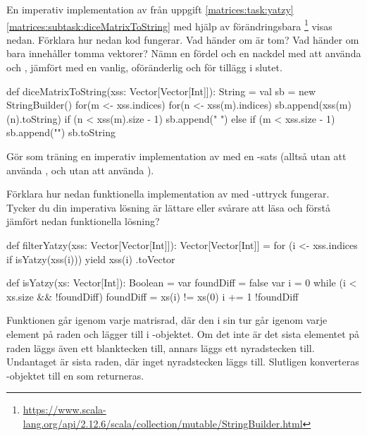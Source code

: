 \Subtask En imperativ implementation av  från uppgift \ref{matrices:task:yatzy}\ref{matrices:subtask:diceMatrixToString} med hjälp av förändringsbara  \footnote{\url{https://www.scala-lang.org/api/2.12.6/scala/collection/mutable/StringBuilder.html}} visas nedan. Förklara hur nedan kod fungerar. Vad händer om  är tom? Vad händer om  bara innehåller tomma vektorer? Nämn en fördel och en nackdel med att använda  och , jämfört med en vanlig, oföränderlig  och \code{+} för tillägg i slutet.
\begin{Code}
def diceMatrixToString(xss: Vector[Vector[Int]]): String = {
  val sb = new StringBuilder()
  for(m <- xss.indices) {
    for(n <- xss(m).indices) {
      sb.append(xss(m)(n).toString)
      if (n < xss(m).size - 1) sb.append(" ")
      else if (m < xss.size - 1) sb.append("\n")
    }
  }
  sb.toString
}
\end{Code}

\Subtask Gör som träning en imperativ implementation av  med en -sats (alltså utan att använda , och utan att använda ).


\Subtask Förklara hur nedan funktionella implementation av  med -uttryck fungerar. Tycker du din imperativa lösning är lättare eller svårare att läsa och förstå jämfört nedan funktionella lösning?
\begin{CodeSmall}
def filterYatzy(xss: Vector[Vector[Int]]): Vector[Vector[Int]] = {
  for (i <- xss.indices if isYatzy(xss(i))) yield xss(i)
}.toVector
\end{CodeSmall}


\SOLUTION

\TaskSolved \what

\SubtaskSolved  \begin{Code}
def isYatzy(xs: Vector[Int]): Boolean = {
	var foundDiff = false
	var i = 0
	while (i < xs.size && !foundDiff) {
		foundDiff = xs(i) != xs(0)
		i += 1
	}
	!foundDiff
}
\end{Code}


\SubtaskSolved  Funktionen går igenom varje matrisrad, där den i sin tur går igenom
varje element på raden och lägger till i -objektet. Om det inte är
det sista elementet på raden läggs även ett blanktecken till, annars läggs ett
nyradstecken till. Undantaget är sista raden, där inget nyradstecken läggs till.
Slutligen konverteras -objektet till en  som
returneras.


